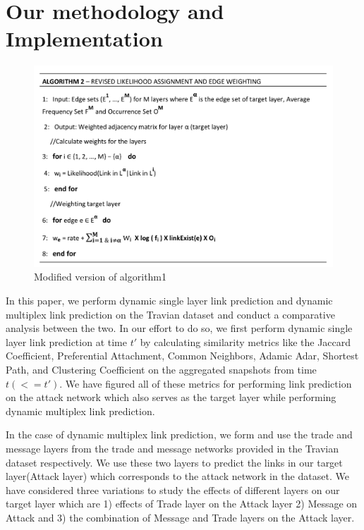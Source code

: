 \section{Our methodology and Implementation}
\label{sec:implementation}


\begin{figure}[t]
{
\setlength{\belowcaptionskip}{-15pt}
\includegraphics[width=\linewidth]{pics/algo2f.png}  
\caption{Modified version of algorithm1}
\label{fig:algo2} 
}
\end{figure}

In this paper, we perform dynamic single layer link prediction and dynamic
multiplex link prediction on the Travian dataset and conduct a comparative
analysis between the two.  In our effort to do so, we first perform dynamic
single layer link prediction at time $t'$ by calculating similarity metrics
like the Jaccard Coefficient, Preferential Attachment, Common Neighbors,
Adamic Adar, Shortest Path, and Clustering Coefficient on the aggregated
snapshots from time $t(<= t')$. We have figured all of these metrics for
performing link prediction on the attack network which also serves as the
target layer while performing dynamic multiplex link prediction.

In the case of dynamic multiplex link prediction, we form and use the trade
and message layers from the trade and message networks provided in the Travian
dataset respectively. We use these two layers to predict the links in our
target layer(Attack layer) which corresponds to the attack network in the
dataset. We have considered three variations to study the effects of different
layers on our target layer which are 1) effects of Trade layer on the Attack
layer 2) Message on Attack and 3) the combination of Message and Trade layers
on the Attack layer.

